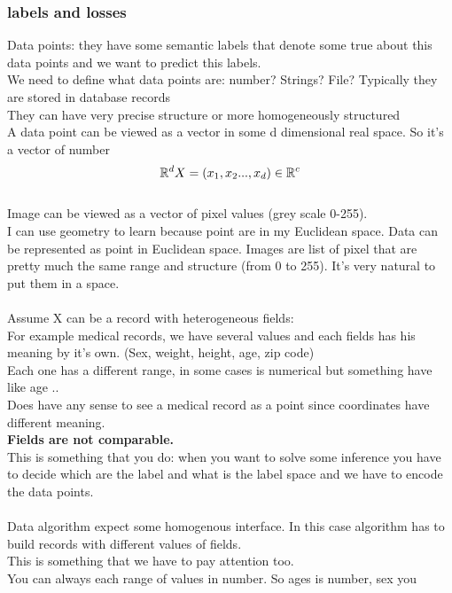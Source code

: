 \documentclass[../main.tex]{subfiles}
\begin{document}
\subsubsection{labels and losses}
Data points: they have some semantic labels that denote some true about this data points and we want to predict this labels.\\
We need to define what data points are: number? Strings? File? Typically they are stored in database records \\
They can have very precise structure or more homogeneously structured \\
A data point can be viewed as a vector in some d dimensional real space. So it’s a vector of number
\\
$$
\mathbb{R}^d\\\\
X = (x_1,x_2 ..., x_d) \in \mathbb{R}^c
$$
\\
Image can be viewed as a vector of pixel values (grey scale 0-255).\\
I can use geometry to learn because point are in my Euclidean space. Data can be represented as point in Euclidean space. Images are list of pixel that are pretty much the same range and structure (from 0 to 255). It’s very natural to put them in a space.\\\\
Assume X can be a record with heterogeneous fields:\\
For example medical records, we have several values and each fields has his meaning by it’s own. (Sex, weight, height, age, zip code)\\
Each one has a different range, in some cases is numerical but something have like age ..\\
Does have any sense to see a medical record as a point since coordinates
have different meaning.\\
\textbf{Fields are not comparable.}\\
This is something that you do: when you want to solve some inference you have to decide which are the label and what is the label space and we have to encode the data points.\\\\
Data algorithm expect some homogenous interface.
In this case algorithm has to build records with different values of fields.\\
This is something that we have to pay attention too.\\
You can always each range of values in number. So ages is number, sex you
\end{document}
